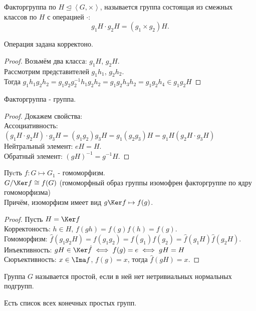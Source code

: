 \documentclass[11pt, oneside]{article}   	%
\begin{document}
    \begin{definition}
        Факторгруппа по $H \unlhd \left<G, \times\right>$, называется группа состоящая из смежных классов по $H$ с операцией $\cdot $:
        \[ g_1H\cdot g_2H = (g_1 \times g_2)H .\] 
    \end{definition}
    \begin{dlemma}
        Операция задана корректоно.
        \begin{proof}
            Возьмём два класса: $g_1H$, $g_2H$.\\
            Рассмотрим представителей $g_1h_1$, $g_2h_2$.\\
            Тогда $g_1h_1g_2h_2 = g_1g_2g_2^{-1}h_1g_2h_2 = g_1g_2h_3h_2 = g_1g_2h_4\in g_1g_2H$
        \end{proof}
    \end{dlemma}
    \begin{dlemma}
        Факторгруппа - группа.
        \begin{proof} Докажем свойства:\\
            Ассоциативность: $(g_1H\cdot g_2H)\cdot g_3H = (g_1g_2)g_3H = g_1(g_2g_3)H = g_1H(g_2H\cdot g_3H)$
            Нейтральный элемент: $eH = H$.\\
            Обратный элемент: $(gH)^{-1} = g^{-1}H$.
        \end{proof}
    \end{dlemma}
    \begin{theorem}
        Пуcть $f: G \mapsto G_1$ - гомоморфизм.\\
        $G/\Ker f \cong f(G)$ (гомоморфный образ группы изомофрен факторгруппе по ядру гомоморфизма)\\
        Причём, изоморфизм имеет вид $g\Ker f \mapsto f(g)$.\\
        \begin{proof}
            Пусть $H=\Ker f$\\
            Корректоность: $h\in H$, $f(gh) = f(g)f(h) = f(g)$.\\
            Гомоморфизм: $\hat{f}(g_1g_2H) = f(g_1g_2) = f(g_1)f(g_2) = \hat{f}(g_1H)\hat{f}(g_2H)$.\\
            Инъективность: $gH\in \Ker \hat{f} \iff f(g) = e \iff gH = H$\\
            Сюръективность: $x\in \Ima f$, $f(g) = x$, тогда $\hat{f}(gH) = x$.
        \end{proof}
    \end{theorem}
    \begin{definition}
        Группа $G$ называется простой, если в ней нет нетривиальных нормальных подгрупп.
    \end{definition}
    \begin{theorem}
        Есть список всех конечных простых групп.
    \end{theorem}
\end{document}
